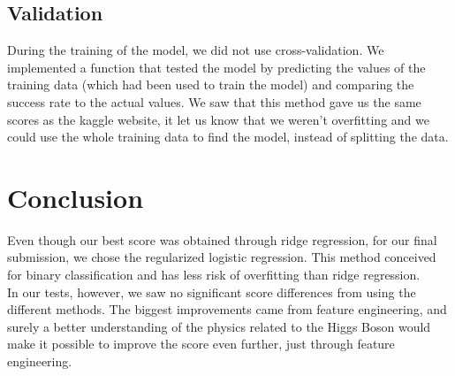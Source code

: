\documentclass[10pt,conference,compsocconf]{IEEEtran}
\begin{document}
\subsection{Validation}

During the training of the model, we did not use cross-validation. We implemented a function that tested the model by predicting the values of the training data (which had been used to train the model) and comparing the success rate to the actual values. We saw that this method gave us the same scores as the kaggle website, it let us know that we weren't overfitting and we could use the whole training data to find the model, instead of splitting the data.

\section{Conclusion}

Even though our best score was obtained through ridge regression, for our final submission, we chose the regularized logistic regression. This method conceived for binary classification and has less risk of overfitting than ridge regression. \\
In our tests, however, we saw no significant score differences from using the different methods. The biggest improvements came from feature engineering, and surely a better understanding of the physics related to the Higgs Boson would make it possible to improve the score even further, just through feature engineering.
\end{document}
